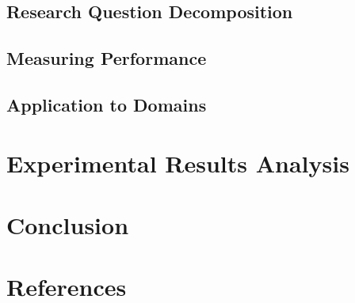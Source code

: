 \documentclass[12pt]{article}
\begin{document}
\subsection{Research Question Decomposition}

\subsection{Measuring Performance}

\subsection{Application to Domains}


\section{Experimental Results Analysis}

\section{Conclusion}

\section{References}
\end{document}
